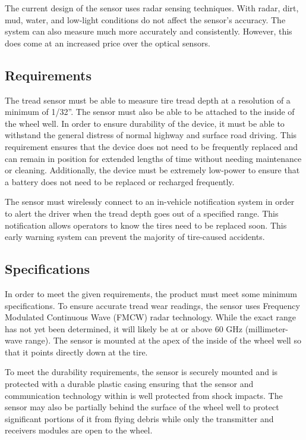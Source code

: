 \documentclass[11pt]{IEEEtran}
\begin{document}
			The current design of the sensor uses radar sensing techniques. With radar, dirt, mud, water, and low-light conditions do not affect the sensor's accuracy. The system can also measure much more accurately and consistently. However, this does come at an increased price over the optical sensors. 

		\subsection{Requirements}
			The tread sensor must be able to measure tire tread depth at a resolution of a minimum of 1/32''. The sensor must also be able to be attached to the inside of the wheel well. In order to ensure durability of the device, it must be able to withstand the general distress of normal highway and surface road driving. This requirement ensures that the device does not need to be frequently replaced and can remain in position for extended lengths of time without needing maintenance or cleaning. Additionally, the device must be extremely low-power to ensure that a battery does not need to be replaced or recharged frequently.

			The sensor must wirelessly connect to an in-vehicle notification system in order to alert the driver when the tread depth goes out of a specified range. This notification allows operators to know the tires need to be replaced soon. This early warning system can prevent the majority of tire-caused accidents.
 
		\subsection{Specifications}
			In order to meet the given requirements, the product must meet some minimum specifications. To ensure accurate tread wear readings, the sensor uses Frequency Modulated Continuous Wave (FMCW) radar technology. While the exact range has not yet been determined, it will likely be at or above 60 GHz (millimeter-wave range). The sensor is mounted at the apex of the inside of the wheel well so that it points directly down at the tire. 

			To meet the durability requirements, the sensor is securely mounted and is protected with a durable plastic casing ensuring that the sensor and communication technology within is well protected from shock impacts. The sensor may also be partially behind the surface of the wheel well to protect significant portions of it from flying debris while only the transmitter and receivers modules are open to the wheel.
\end{document}

